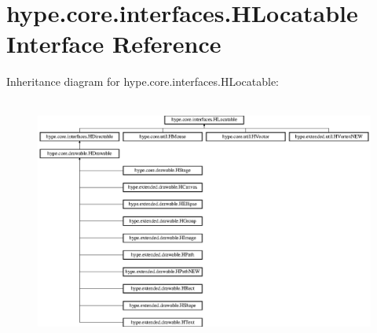 \hypertarget{interfacehype_1_1core_1_1interfaces_1_1_h_locatable}{\section{hype.\-core.\-interfaces.\-H\-Locatable Interface Reference}
\label{interfacehype_1_1core_1_1interfaces_1_1_h_locatable}
}
Inheritance diagram for hype.\-core.\-interfaces.\-H\-Locatable\-:\begin{figure}[H]
\begin{center}
\leavevmode
\includegraphics[height=8.088889cm]{interfacehype_1_1core_1_1interfaces_1_1_h_locatable}
\end{center}
\end{figure}
